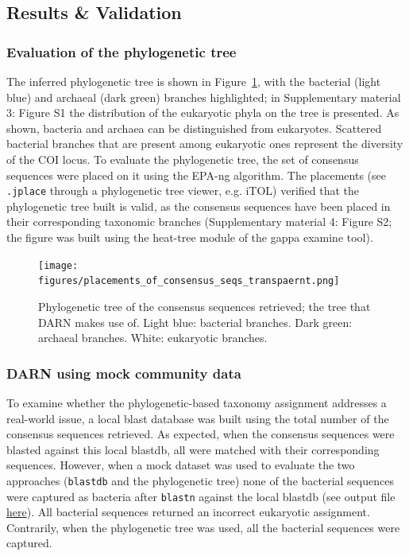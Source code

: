    \subsection{Results \& Validation}
   \label{darn-results}
   \subsubsection*{Evaluation of the phylogenetic tree}
   \label{darn-results-tree-evaluation}

   The inferred phylogenetic tree is shown in Figure~\ref{fig:darn-ref-placements}, with the bacterial (light blue) and archaeal (dark green) branches highlighted;
   in Supplementary material 3: Figure S1 the distribution of the eukaryotic phyla on the tree is presented. 
   As shown, bacteria and archaea can be distinguished from eukaryotes. 
   Scattered bacterial branches that are present among eukaryotic ones represent the diversity of the COI locus. 
   To evaluate the phylogenetic tree, the set of consensus sequences were placed on it using the EPA-ng algorithm. 
   The placements (see \texttt{.jplace} through a phylogenetic tree viewer, e.g. iTOL) verified that the phylogenetic tree built is valid, as the consensus sequences have been placed in their corresponding taxonomic branches (Supplementary material 4: Figure S2; the figure was built using the heat-tree module of the gappa examine tool).

   \begin{figure}[h]
      \centering
      \texttt{[image: figures/placements\_of\_consensus\_seqs\_transpaernt.png]}
      \caption[Placements of the consensus COI sequences on the reference COI tree]{
         Phylogenetic tree of the consensus sequences retrieved; the tree that DARN makes use of. Light blue: bacterial branches. 
         Dark green: archaeal branches. White: eukaryotic branches.
      }
      \label{fig:darn-ref-placements}
   \end{figure}


\newpage
   \subsubsection*{DARN using mock community data}

   To examine whether the phylogenetic-based taxonomy assignment addresses a real-world issue, a local blast database was built using the total number of the consensus sequences retrieved. 
   As expected, when the consensus sequences were blasted against this local blastdb, all were matched with their corresponding sequences. 
   However, when a mock dataset was used to evaluate the two approaches (\texttt{blastdb} and the phylogenetic tree) none of the bacterial sequences were captured as bacteria after \texttt{blastn} against the local blastdb (see output file \href{https://github.com/hariszaf/darn/blob/pfam/evaluation/consensus_blast_assignments.txt}{here}). 
   All bacterial sequences returned an incorrect eukaryotic assignment. 
   Contrarily, when the phylogenetic tree was used, all the bacterial sequences were captured.
